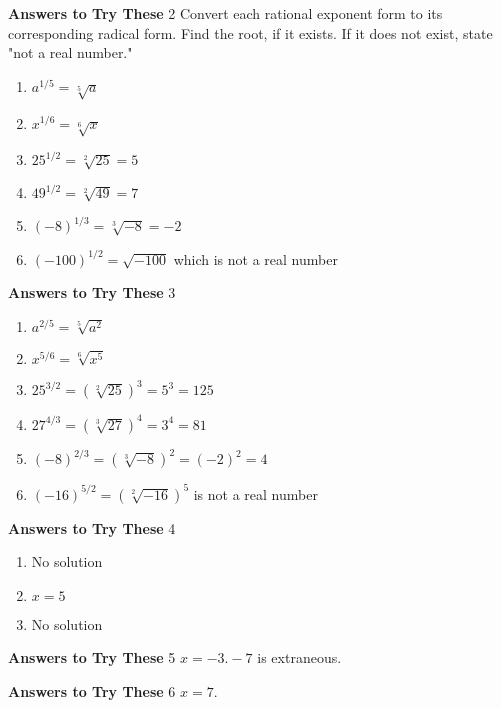 \documentclass[a4paper]{JAC2003}
\begin{document}
\noindent\textcolor{red!75!black}{\textbf{Answers to Try These}} 2 Convert each rational exponent form to its corresponding radical form. Find the root, if it exists. If it does not exist, state "not a real number."
\begin{enumerate}
\item $a^{1 / 5}=\sqrt[5]{a}$

\item $x^{1 / 6}=\sqrt[6]{x}$

\item $25^{1 / 2}=\sqrt[2]{25}=5$ %

\item $49^{1 / 2}=\sqrt[2]{49}=7$ %

\item $(-8)^{1 / 3}=\sqrt[3]{-8}=-2$

\item $(-100)^{1 / 2}=\sqrt{-100}$ which is not a real number
\end{enumerate}

\noindent\textcolor{red!75!black}{\textbf{Answers to Try These}} 3
\begin{enumerate}
\item $a^{2 / 5}=\sqrt[5]{a^{2}}$

\item $x^{5 / 6}=\sqrt[6]{x^{5}}$

\item $25^{3 / 2}=(\sqrt[2]{25})^{3}=5^{3}=125$

\item $27^{4 / 3}=(\sqrt[3]{27})^{4}=3^{4}=81$

\item $(-8)^{2 / 3}=(\sqrt[3]{-8})^{2}=(-2)^{2}=4$

\item $(-16)^{5 / 2}=(\sqrt[2]{-16})^{5}$ is not a real number
\end{enumerate}
\newpage
\noindent\textcolor{red!75!black}{\textbf{Answers to Try These}} 4
\begin{enumerate}
\item No solution

\item $x=5$

\item No solution
\end{enumerate}

\noindent\textcolor{red!75!black}{\textbf{Answers to Try These}} 5 $x=-3 .-7$ is extraneous.

\noindent\textcolor{red!75!black}{\textbf{Answers to Try These}} 6 $x=7$.
\end{document}
